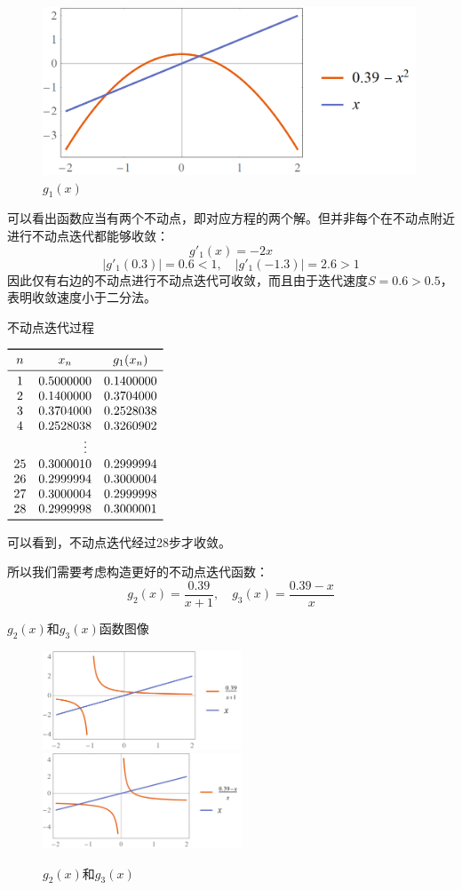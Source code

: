 \documentclass{ctexart}
\begin{document}
\begin{figure}[htbp]
  \centering
  \includegraphics[width=30em]{plot2.png}
  \caption{$g_1(x)$}
  \label{fig:plot2}
\end{figure}

可以看出函数应当有两个不动点，即对应方程的两个解。但并非每个在不动点附近进行不动点迭代都能够收敛：
\[
g'_1(x) = -2x
\]
\[
|g'_1(0.3)| = 0.6 < 1,\quad |g'_1(-1.3)| = 2.6 > 1
\]
因此仅有右边的不动点进行不动点迭代可收敛，而且由于迭代速度$S=0.6>0.5$，表明收敛速度小于二分法。

\begin{table}[htpb]
\centering
\caption{不动点迭代过程}
$\begin{array}{ccc}
    \toprule
n & x_n & g_1(x_n) \\
\midrule
 1 & 0.5000000 & 0.1400000 \\
 2 & 0.1400000 & 0.3704000 \\
 3 & 0.3704000 & 0.2528038 \\
 4 & 0.2528038 & 0.3260902 \\
\multicolumn{3}{c}{\vdots} \\
25 & 0.3000010 & 0.2999994 \\
26 & 0.2999994 & 0.3000004 \\
27 & 0.3000004 & 0.2999998 \\
28 & 0.2999998 & 0.3000001 \\
    \bottomrule
\end{array}\label{table:fpi1}$
\end{table}

可以看到，不动点迭代经过28步才收敛。

所以我们需要考虑构造更好的不动点迭代函数：
\[
g_2(x) = \frac{0.39}{x + 1},\quad g_3(x) = \frac{0.39 - x}{x}
\]

$g_2(x)$和$g_3(x)$函数图像

\begin{figure}[htbp]
  \centering
  \includegraphics[width=16em]{plot3.png}
  \includegraphics[width=16em]{plot4.png}
  \caption{$g_2(x)$和$g_3(x)$}
  \label{fig:plot3}
\end{figure}
\end{document}
